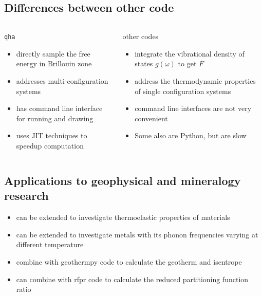 \documentclass[13pt,aspectratio=169]{beamer}
\begin{document}
\subsection{Differences between other code}
\begin{frame}{\subsecname}
	\begin{columns}
		\begin{column}{0.45\textwidth}
			\texttt{qha}\\
			\begin{itemize}
				\item directly sample the free energy in Brillouin zone
				\item addresses multi-configuration systems
				\item has command line interface for running and drawing
				\item uses JIT techniques to speedup computation
			\end{itemize}
		\end{column}

		\begin{column}{0.45\textwidth}
			other codes\\
			\begin{itemize}
				\item integrate the vibrational density of states $g(\omega)$ to get $F$
				\item address the thermodynamic properties of single configuration systems
				\item command line interfaces are not very convenient
				\item Some also are Python, but are slow
			\end{itemize}
		\end{column}
	\end{columns}
\end{frame}

\subsection{Applications to geophysical and mineralogy research}
\begin{frame}{\subsecname}
	\begin{itemize}
		\item can be extended to investigate thermoelastic properties of materials
		\item can be extended to investigate metals with its phonon frequencies varying at different temperature
		\item combine with geothermpy code to calculate the geotherm and isentrope
		\item can combine with rfpr code to calculate the reduced partitioning function ratio
	\end{itemize}
\end{frame}
\end{document}
